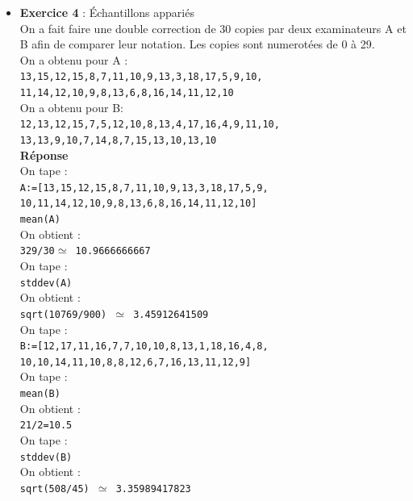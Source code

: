 \documentclass[a4paper,11pt]{book}
\begin{document}
\begin{itemize}
\item{\bf Exercice 4} : \'Echantillons appari\'es\\
On a fait faire une double correction de 30 copies par deux examinateurs A et B
afin de comparer leur notation. Les copies sont numerot\'ees de 0 \`a 29. \\
On a obtenu pour A :\\
{\tt 13,15,12,15,8,7,11,10,9,13,3,18,17,5,9,10,}\\
{\tt 11,14,12,10,9,8,13,6,8,16,14,11,12,10}\\
On a obtenu pour B:\\
{\tt 12,13,12,15,7,5,12,10,8,13,4,17,16,4,9,11,10,}\\
{\tt 13,13,9,10,7,14,8,7,15,13,10,13,10}\\ 
{\bf R\'eponse}\\
On tape :\\
{\tt A:=[13,15,12,15,8,7,11,10,9,13,3,18,17,5,9,}\\
{\tt 10,11,14,12,10,9,8,13,6,8,16,14,11,12,10]} \\
{\tt mean(A)}\\
On obtient :\\
{\tt 329/30$\simeq$ 10.9666666667}\\
On tape :\\
{\tt stddev(A)}\\
On obtient :\\
{\tt sqrt(10769/900) $\simeq$ 3.45912641509}\\
On tape :\\
{\tt B:=[12,17,11,16,7,7,10,10,8,13,1,18,16,4,8,}\\
{\tt 10,10,14,11,10,8,8,12,6,7,16,13,11,12,9]}\\
On tape :\\
{\tt mean(B)}\\
On obtient :\\
{\tt 21/2=10.5}\\
On tape :\\
{\tt stddev(B)}\\
On obtient :\\
{\tt sqrt(508/45) $\simeq$ 3.35989417823}\\


\end{itemize}
\end{document}
